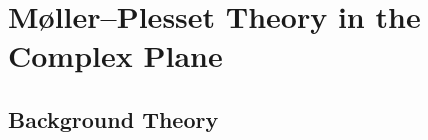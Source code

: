 \documentclass[aps,prb,reprint,noshowkeys,superscriptaddress]{revtex4-1}
\newcommand{\titou}[1]{\textcolor{red}{#1}}
\begin{document}

\section{M{\o}ller--Plesset Theory in the Complex Plane}
\label{sec:MP}


\subsection{Background Theory}
\end{document}
